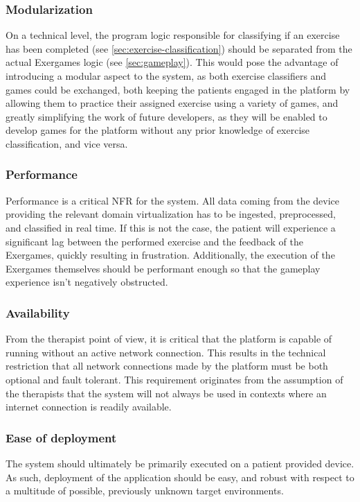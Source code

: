\subsubsection{Modularization}
\label{sec:nfr:modularization}
On a technical level, the program logic responsible for classifying if an exercise has been completed (see \ref{sec:exercise-classification}) should be separated from the actual Exergames logic (see \ref{sec:gameplay}). This would pose the advantage of introducing a modular aspect to the system, as both exercise classifiers and games could be exchanged, both keeping the patients engaged in the platform by allowing them to practice their assigned exercise using a variety of games, and greatly simplifying the work of future developers, as they will be enabled to develop games for the platform without any prior knowledge of exercise classification, and vice versa.

\subsubsection{Performance}
\label{sec:nfr:performance}
Performance is a critical \gls{NFR} for the system. All data coming from the device providing the relevant domain virtualization has to be ingested, preprocessed, and classified in real time. If this is not the case, the patient will experience a significant lag between the performed exercise and the feedback of the Exergames, quickly resulting in frustration. Additionally, the execution of the Exergames themselves should be performant enough so that the gameplay experience isn't negatively obstructed. 

\subsubsection{Availability}
\label{sec:nfr:availability}
From the therapist point of view, it is critical that the platform is capable of running without an active network connection. This results in the technical restriction that all network connections made by the platform must be both optional and fault tolerant. This requirement originates from the assumption of the therapists that the system will not always be used in contexts where an internet connection is readily available.


\subsubsection{Ease of deployment}
\label{sec:nfr:deployment}
The system should ultimately be primarily executed on a patient provided device. As such, deployment of the application should be easy, and robust with respect to a multitude of possible, previously unknown target environments.

